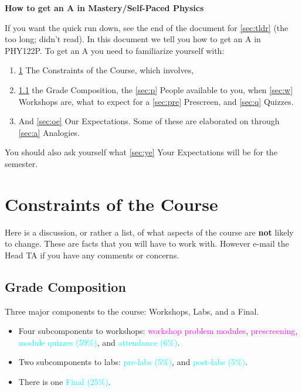 \documentclass[12pt]{article}
\begin{document}
\hspace{1pt}

\begin{center}
\textbf{\Large How to get an A in Mastery/Self-Paced Physics}
\end{center}

\noindent If you want the quick run down, see the end of the document for \ref{sec:tldr} (the too long; didn't read). In this document we tell you how to get an A in PHY122P. To get an A you need to familiarize yourself with:

\begin{enumerate}
	\item \ref{sec:cons} The Constraints of the Course, which involves,
	\item \ref{sec:gs} the Grade Composition, the \ref{sec:p} People available to you, when \ref{sec:w} Workshops are, what to expect for a \ref{sec:pre} Prescreen, and \ref{sec:q} Quizzes.
	\item And \ref{sec:oe} Our Expectations. Some of these are elaborated on through \ref{sec:a} Analogies.
\end{enumerate}

\noindent You should also ask yourself what \ref{sec:ye} Your Expectations will be for the semester.

\section{Constraints of the Course} \label{sec:cons}

Here is a discussion, or rather a list, of what aspects of the course are \textbf{not} likely to change. These are facts that you will have to work with. However e-mail the Head TA if you have any comments or concerns.

\subsection{Grade Composition} \label{sec:gs}

\noindent Three major components to the course: Workshops, Labs, and a Final.

\begin{itemize}
	\item Four subcomponents to workshops: \textcolor{magenta}{workshop problem modules}, \textcolor{magenta}{prescreening}, \textcolor{cyan}{module quizzes (59\%)}, and \textcolor{cyan}{attendance (6\%)}.
	\item Two subcomponents to labs: \textcolor{cyan}{pre-labs (5\%)}, and \textcolor{cyan}{post-labs (5\%)}.
	\item There is one \textcolor{cyan}{Final (25\%)}.
\end{itemize}
\end{document}
